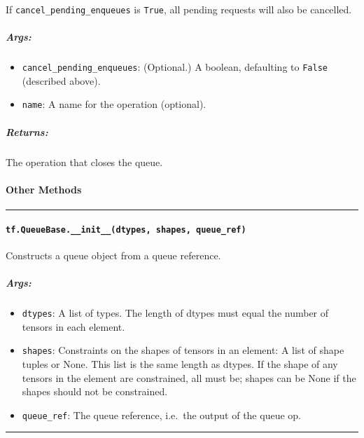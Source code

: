 If \texttt{cancel\_pending\_enqueues} is \texttt{True}, all pending
requests will also be cancelled.

\subparagraph{Args: }\label{args-52}

\begin{itemize}
\tightlist
\item
  \texttt{cancel\_pending\_enqueues}: (Optional.) A boolean, defaulting
  to \texttt{False} (described above).
\item
  \texttt{name}: A name for the operation (optional).
\end{itemize}

\subparagraph{Returns: }\label{returns-46}

The operation that closes the queue.

\paragraph{Other Methods }\label{other-methods}

\begin{center}\rule{0.5\linewidth}{\linethickness}\end{center}

\paragraph{\texorpdfstring{\texttt{tf.QueueBase.\_\_init\_\_(dtypes,\ shapes,\ queue\_ref)}
}{tf.QueueBase.\_\_init\_\_(dtypes, shapes, queue\_ref) }}\label{tf.queuebase.ux5fux5finitux5fux5fdtypes-shapes-queueux5fref}

Constructs a queue object from a queue reference.

\subparagraph{Args: }\label{args-53}

\begin{itemize}
\tightlist
\item
  \texttt{dtypes}: A list of types. The length of dtypes must equal the
  number of tensors in each element.
\item
  \texttt{shapes}: Constraints on the shapes of tensors in an element: A
  list of shape tuples or None. This list is the same length as dtypes.
  If the shape of any tensors in the element are constrained, all must
  be; shapes can be None if the shapes should not be constrained.
\item
  \texttt{queue\_ref}: The queue reference, i.e.~the output of the queue
  op.
\end{itemize}

\begin{center}\rule{0.5\linewidth}{\linethickness}\end{center}

